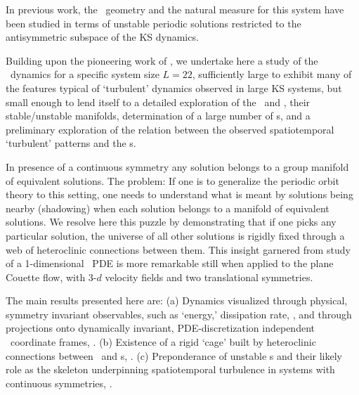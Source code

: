 In previous work, the \statesp\ geometry and the natural measure for
this system have been
studied in terms of unstable
periodic solutions restricted to the antisymmetric subspace of the
KS dynamics.


Building upon the pioneering work of ,
we undertake here
a study of the \KS\ dynamics
for a specific system size $L = 22$, sufficiently large
to exhibit many of the features typical of `turbulent' dynamics
observed in large KS systems, but small enough to lend itself to a
detailed exploration of the  \eqva\ and \reqva,
their stable/unstable manifolds,
determination of a large number of
\rpo s, and a preliminary exploration of the relation between the
observed spatiotemporal `turbulent' patterns and the \rpo s.


In presence of a continuous symmetry any solution belongs to a group
manifold of equivalent solutions. The problem: If one is to
generalize the periodic orbit theory to this setting, one needs to
understand what is meant by solutions being nearby (shadowing) when
each solution belongs to a manifold of equivalent solutions. We
resolve here this puzzle by demonstrating that if one picks any
particular solution, the universe of all other solutions is rigidly
fixed through a web of heteroclinic connections between them. This
insight garnered from study of a 1-dimensional \KS\ PDE is more
remarkable still when applied to the plane Couette flow,
with 3-$d$ velocity fields and two translational symmetries.


The main results presented here are: (a) Dynamics visualized through
physical, symmetry invariant observables, such as `energy,'
dissipation rate, \etc,
and through
projections onto dynamically invariant, PDE-discretization
independent \statesp\ coordinate frames, . (b)
Existence of a rigid `cage' built by heteroclinic connections
between \eqva\ and \po s, . (c) Preponderance of
unstable \rpo s and their likely role as the skeleton underpinning
spatiotemporal turbulence in systems with continuous symmetries,
\refsect{sec:rpos}.
